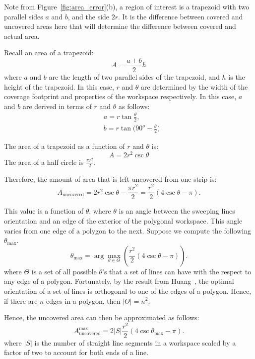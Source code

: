 \documentclass[../main.tex]{subfiles}
\begin{document}
Note from Figure~\ref{fig:area_error}(b), a region of interest is a trapezoid with two parallel sides $a$ and $b$, and the side $2r$. It is the difference between covered and uncovered areas here that will determine the difference between covered and actual area.

Recall an area of a trapezoid:
\begin{equation}
	A=\frac{a+b}{2}h
\end{equation}
where $a$ and $b$ are the length of two parallel sides of the trapezoid, and $h$ is the height of the trapezoid. In this case, $r$ and $\theta$ are determined by the width of the coverage footprint and properties of the workspace respectively. In this case, $a$ and $b$ are derived in terms of $r$ and $\theta$ as follows:
\begin{equation}
	\begin{aligned}
		&a=r\tan{\frac{\theta}{2}},\\
		&b=r\tan{(90^o-\frac{\theta}{2}})
	\end{aligned}
\end{equation}

The area of a trapezoid as a function of $r$ and $\theta$ is:
\begin{equation}
	A=2r^2\csc{\theta}
\end{equation}
The area of a half circle is $\frac{\pi r^2}{2}$.

Therefore, the amount of area that is left uncovered from one strip is:
\begin{equation}
	A_{\text{uncovered}}=2r^2\csc\theta-\frac{\pi r^2}{2}=\frac{r^2}{2}(4\csc\theta-\pi).
\end{equation}

This value is a function of $\theta$, where $\theta$ is an angle between the sweeping lines orientation and an edge of the exterior of the polygonal workspace. This angle varies from one edge of a polygon to the next. Suppose we compute the following $\theta_{\max}$.
\begin{equation}
	\theta_{\max}=\arg\max_{\theta\in\Theta}(\frac{r^2}{2}(4\csc\theta-\pi)).
\end{equation}%
where $\Theta$ is a set of all possible $\theta$'s that a set of lines can have with the respect to any edge of a polygon. Fortunately, by the result from Huang~\cite{Huang2001optimal}, the optimal orientation of a set of lines is orthogonal to one of the edges of a polygon. Hence, if there are $n$ edges in a polygon, then $|\Theta|=n^2$.

Hence, the uncovered area can then be approximated as follows:
\begin{equation}
	A_{\text{uncovered}}^{\max}=2|S|\frac{r^2}{2}(4\csc\theta_{\max}-\pi).
\end{equation}%
where $|S|$ is the number of straight line segments in a workspace scaled by a factor of two to account for both ends of a line.
\end{document}
